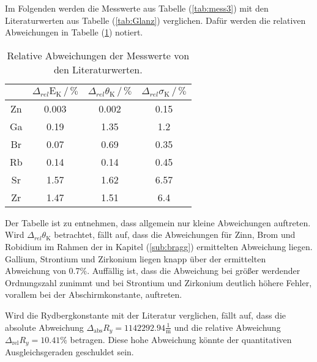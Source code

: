 \noindent
Im Folgenden werden die Messwerte aus Tabelle (\ref{tab:mess3}) mit den Literaturwerten aus Tabelle (\ref{tab:Glanz}) verglichen.
Dafür werden die relativen Abweichungen in Tabelle (\ref{tab:disk}) notiert.

\begin{table}
    \centering
    \caption{Relative Abweichungen der Messwerte von den Literaturwerten.}
    \begin{tabular}{c c c c}
    \toprule
         &  $\Delta_{rel}\text{E}_\text{K} \,/\, \%$ & $\Delta_{rel}\theta_\text{K} \,/\, \% $ & $\Delta_{rel}\sigma_\text{K} \,/\, \% $\\
    \midrule 
      Zn & 0.003& 0.002& 0.15 \\
      Ga & 0.19 & 1.35 & 1.2  \\
      Br & 0.07 & 0.69 & 0.35 \\
      Rb & 0.14 & 0.14 & 0.45 \\
      Sr & 1.57 & 1.62 & 6.57 \\
      Zr & 1.47 & 1.51 & 6.4  \\
    \bottomrule
    \end{tabular}
    \label{tab:disk}
    \end{table}

\noindent
Der Tabelle ist zu entnehmen, dass allgemein nur kleine Abweichungen auftreten.
Wird $\Delta_{rel}\theta_\text{K}$ betrachtet, fällt auf, 
dass die Abweichungen für Zinn, Brom und Robidium im Rahmen der in Kapitel (\ref{sub:bragg}) ermittelten Abweichung liegen.
Gallium, Strontium und Zirkonium liegen knapp über der ermittelten Abweichung von 0.7\%.
Auffällig ist, dass die Abweichung bei größer werdender Ordnungszahl zunimmt und bei Strontium und Zirkonium deutlich höhere Fehler,
vorallem bei der Abschirmkonstante, auftreten.


\noindent
Wird die Rydbergkonstante mit der Literatur verglichen, fällt auf, dass die absolute Abweichung $\Delta_{\text{abs}} R_y= 1142292.94 \frac{1}{\text{m}}$ und die relative Abweichung $\Delta_{\text{rel}} R_y= 10.41\%$
betragen.
Diese hohe Abweichung könnte der quantitativen Ausgleichsgeraden geschuldet sein.